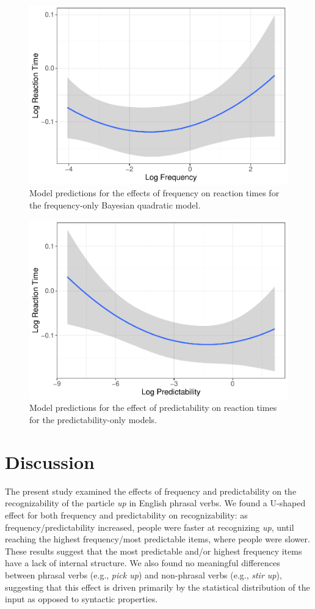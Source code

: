 \documentclass[
  man,floatsintext]{apa6}
\begin{document}
\begin{figure}

{\centering \includegraphics[width=0.6\linewidth]{write-up_files/figure-latex/FreqOnlyPlot-1} 

}

\caption{Model predictions for the effects of frequency on reaction times for the frequency-only Bayesian quadratic model.}\label{fig:FreqOnlyPlot}
\end{figure}

\begin{figure}

{\centering \includegraphics[width=0.6\linewidth]{write-up_files/figure-latex/PredicOnlyPlot-1} 

}

\caption{Model predictions for the effect of predictability on reaction times for the predictability-only models.}\label{fig:PredicOnlyPlot}
\end{figure}

\hypertarget{discussion}{%
\section{Discussion}\label{discussion}}

The present study examined the effects of frequency and predictability on the recognizability of the particle \emph{up} in English phrasal verbs. We found a U-shaped effect for both frequency and predictability on recognizability: as frequency/predictability increased, people were faster at recognizing \emph{up}, until reaching the highest frequency/most predictable items, where people were slower. These results suggest that the most predictable and/or highest frequency items have a lack of internal structure. We also found no meaningful differences between phrasal verbs (e.g., \emph{pick up}) and non-phrasal verbs (e.g., \emph{stir up}), suggesting that this effect is driven primarily by the statistical distribution of the input as opposed to syntactic properties.
\end{document}
